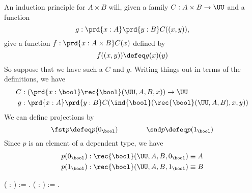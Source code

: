 An induction principle for $A \times B$ will, given a family $C : A \times B
\to \UU$ and a function 
\[
g : \prd{x:A}\prd{y:B} C((x, y)),
\] 
give a function $f : \prd{x : A \times B}C(x)$ defined by
\[
f((x, y)) \defeq g(x)(y)
\]
So suppose that we have such a $C$ and $g$.  Writing things out in terms of the
definitions, we have
\begin{align*}
C &: \left(\prd{x:\bool}\rec{\bool}(\UU, A, B, x)\right) \to \UU \\
g &: \prd{x:A}\prd{y:B} C(\ind{\bool}(\rec{\bool}(\UU, A, B), x, y))
\end{align*}  
We can define projections by
\[
\fst p \defeq p(0_{\bool}) \qquad\qquad \snd p \defeq p(1_{\bool})
\]
Since $p$ is an element of a dependent type, we have
\begin{align*}
p(0_{\bool}) &: \rec{\bool}(\UU, A, B, 0_{\bool}) \equiv A\\
p(1_{\bool}) &: \rec{\bool}(\UU, A, B, 1_{\bool}) \equiv B
\end{align*} \begin{coqdoccode}
\coqdocemptyline
\coqdocnoindent
{}  ( : ) :=  .\coqdoceol
\coqdocnoindent
{}  ( : ) :=  .\coqdoceol
\coqdocemptyline
\end{coqdoccode}


